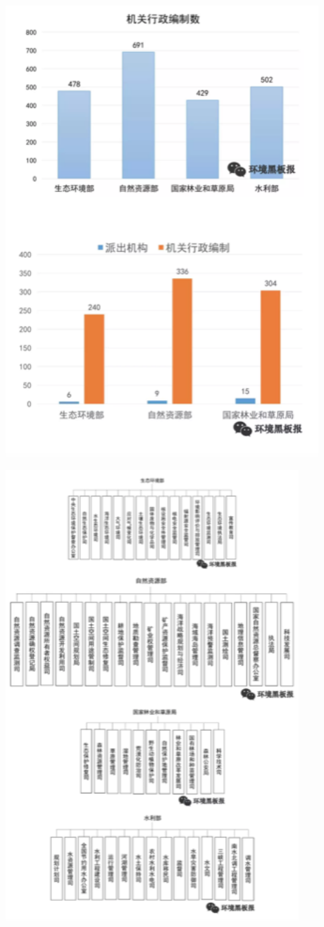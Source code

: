 \documentclass[]{book}
\begin{document}
\includegraphics[width=4.62in]{images/zc1}

\includegraphics[width=4.33in]{images/zc2}
\end{document}
